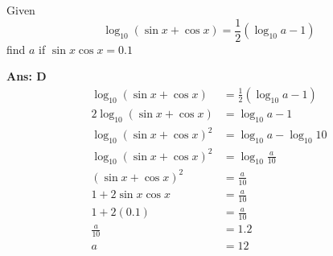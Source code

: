 \documentclass[varwidth=70mm]{standalone}
\begin{document}
Given $$\log_{10}\left(\sin x+\cos x\right) = \frac{1}{2}\left(\log_{10}a-1\right)$$
find $a$ if $\sin x\cos x=0.1$
\begin{choices}
\end{choices}

\begin{answer}
\hrulefill\par
\textbf{Ans: D}
\begin{equation*}
\begin{aligned}
\log_{10}\left(\sin x+\cos x\right) &= \frac{1}{2}\left(\log_{10}a-1\right) \\
2\log_{10}\left(\sin x+\cos x\right) &= \log_{10}a-1 \\
\log_{10}\left(\sin x+\cos x\right)^2 &= \log_{10}a-\log_{10}10 \\
\log_{10}\left(\sin x+\cos x\right)^2 &= \log_{10}\frac{a}{10} \\
\left(\sin x+\cos x\right)^2 &= \frac{a}{10} \\
1 + 2\sin x\cos x &= \frac{a}{10} \\
1 + 2(0.1) &= \frac{a}{10} \\
\frac{a}{10} &= 1.2 \\
a &= 12
\end{aligned}
\end{equation*}
\end{answer}
\end{document}

